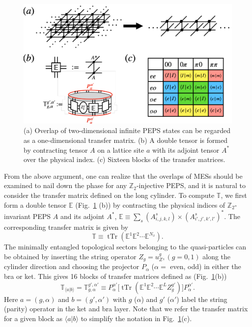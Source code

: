 \documentclass{ntuthesis}
\begin{document}
\begin{figure}[t]
 \centering
\includegraphics[width=\linewidth]{tm_cylinder}
\caption{(a) Overlap of two-dimensional infinite PEPS states can be regarded as a one-dimensional transfer matrix. (b) A double tensor is formed by contracting  tensor $A$ on a lattice site $a$ with its adjoint tensor $A^*$ over the physical index. (c) Sixteen blocks of the transfer matrices.}  
\label{fig:tm_cylinder}
\end{figure}

From the above argument, one can realize that the overlaps of MESs should be examined to nail down the phase for any $\mathbb{Z}_2$-injective PEPS, and it is natural to consider the transfer matrix defined on the long cylinder. 
%
To compute $\mathbb{T}$, we first form a double tensor  $\mathbb{E} $ (Fig.~\ref{fig:tm_cylinder} (b)) by contracting the physical indices of $\mathbb{Z}_2$-invariant PEPS $A$ and its adjoint $A^*$,
 $\mathbb{ E}  \equiv \sum_s ( A^s_{i,j,k,l} ) \times ( A^s_{i',j',k',l'} )^* $. 
%
The corresponding  transfer  matrix  is given by 
\begin{equation}
\mathbb{ T}  \equiv  \operatorname{tTr} ( \mathbb{E}^1  \mathbb{E}^2 \cdots \mathbb{E}^{N_x}   ). 
\end{equation}
%
The  minimally entangled topological sectors belonging to the quasi-particles can be obtained by inserting the string operator $Z_g = u_Z^g , (g=0,1)$  along the cylinder direction and choosing the projector $P_{\alpha}$ ($\alpha=$ even, odd) in either the bra or ket.
%
This gives 16 blocks of transfer matrices defined as (Fig.~\ref{fig:tm_cylinder}(b))
\begin{equation}
\mathbb{ T}_{\langle a|b \rangle} = \mathbb{ T}_{g,\alpha}^ {g',\alpha'}  \equiv  P_{\alpha}^ {\alpha'}  \big[ \operatorname{tTr} ( \mathbb{ E}^1  \mathbb{ E}^2 \cdots \mathbb{ E}^L  {Z}_g^{g'} )  \big]  P_{\alpha}^ {\alpha'}. 
\end{equation}
Here $ a = (g, \alpha) $ and $ b = (g', \alpha') $ with $g$ ($\alpha$) and $g'$  ($\alpha'$) label the string  (parity) operator in the ket and bra layer. 
%
Note that we refer the transfer matrix for a given block as ${\langle a | b \rangle}$ to simplify the notation in Fig.~\ref{fig:tm_cylinder}(c).
\end{document}
